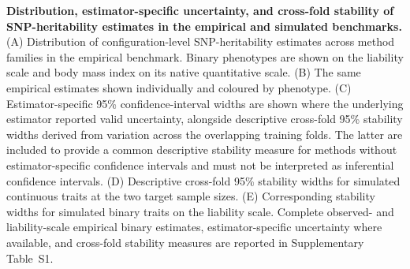 \caption{\textbf{Distribution, estimator-specific uncertainty, and cross-fold stability of SNP-heritability estimates in the empirical and simulated benchmarks.} (A) Distribution of configuration-level SNP-heritability estimates across method families in the empirical benchmark. Binary phenotypes are shown on the liability scale and body mass index on its native quantitative scale. (B) The same empirical estimates shown individually and coloured by phenotype. (C) Estimator-specific 95\% confidence-interval widths are shown where the underlying estimator reported valid uncertainty, alongside descriptive cross-fold 95\% stability widths derived from variation across the overlapping training folds. The latter are included to provide a common descriptive stability measure for methods without estimator-specific confidence intervals and must not be interpreted as inferential confidence intervals. (D) Descriptive cross-fold 95\% stability widths for simulated continuous traits at the two target sample sizes. (E) Corresponding stability widths for simulated binary traits on the liability scale. Complete observed- and liability-scale empirical binary estimates, estimator-specific uncertainty where available, and cross-fold stability measures are reported in Supplementary Table~S1.}
